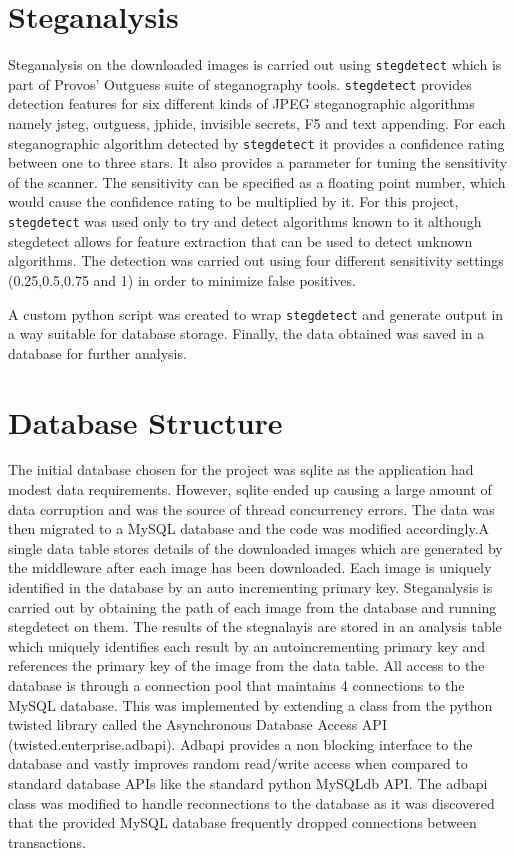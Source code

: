 \section {Steganalysis}
\label{sec:stegtool}
Steganalysis on the downloaded images is carried out using \texttt{stegdetect} which is part of Provos' Outguess suite of steganography tools. \texttt{stegdetect} provides detection features for six different kinds of JPEG steganographic algorithms namely jsteg, outguess, jphide, invisible secrets, F5 and text appending. For each steganographic algorithm detected by \texttt{stegdetect} it provides a confidence rating between one to three stars. It also provides a parameter for tuning the sensitivity of the scanner. The sensitivity can be specified as a floating point number, which would cause the confidence rating to be multiplied by it. For this project, \texttt{stegdetect} was used only to try and detect algorithms known to it although stegdetect allows for feature extraction that can be used to detect unknown algorithms. The detection was carried out using four different sensitivity settings (0.25,0.5,0.75 and 1) in order to minimize false positives.
\par A custom python script was created to wrap \texttt{stegdetect} and generate output in a way suitable for database storage. Finally, the data obtained was saved in a database for further analysis.
\section{Database Structure}
\label{sec:dbstructure}
The initial database chosen for the project was sqlite as the application had modest data requirements. However, sqlite ended up causing a large amount of data corruption and was the source of thread concurrency errors. The data was then migrated to a MySQL database and the code was modified accordingly.A single data table stores details of the downloaded images which are generated by the middleware after each image has been downloaded. Each image is uniquely identified in the database by an auto incrementing primary key. Steganalysis is carried out by obtaining the path of each image from the database and running stegdetect on them. The results of the stegnalayis are stored in an analysis table which uniquely identifies each result by an autoincrementing primary key and references the primary key of the image from the data table. All access to the database is through a connection pool that maintains 4 connections to the MySQL database. This was implemented by extending a class from the python twisted library called the Asynchronous Database Access API (twisted.enterprise.adbapi). Adbapi provides a non blocking interface to the database and vastly improves random read/write access when compared to standard database APIs like the standard python MySQLdb API. The adbapi class was modified to handle reconnections to the database as it was discovered that the provided MySQL database frequently dropped connections between transactions. 
